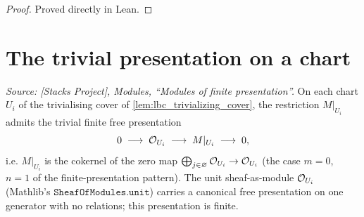\begin{proof}

\leanok
  Proved directly in Lean.
\end{proof}

\section{The trivial presentation on a chart}
\label{sec:lbc_chart_presentation}

\begin{lemma}\leanok
  \label{lem:lbc_chart_presentation}
  \textit{Source: [Stacks Project], Modules, ``Modules of finite
  presentation''.}
  On each chart \(U_i\) of the trivialising cover of
  \cref{lem:lbc_trivializing_cover}, the restriction \(M|_{U_i}\) admits the
  trivial finite free presentation
  \[
    0 \;\longrightarrow\; \mathcal{O}_{U_i} \;\longrightarrow\; M|_{U_i}
    \;\longrightarrow\; 0,
  \]
  i.e. \(M|_{U_i}\) is the cokernel of the zero map
  \(\bigoplus_{j \in \varnothing} \mathcal{O}_{U_i} \to \mathcal{O}_{U_i}\)
  (the case \(m = 0\), \(n = 1\) of the finite-presentation pattern). The
  unit sheaf-as-module \(\mathcal{O}_{U_i}\) (Mathlib's \(\mathtt{SheafOfModules.unit}\))
  carries a canonical free presentation on one generator with no relations;
  this presentation is finite.
\end{lemma}

